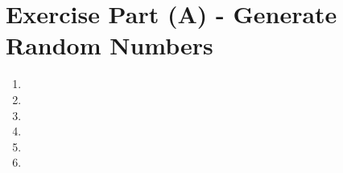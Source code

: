 \section*{Exercise Part (A) - Generate Random Numbers}

\begin{enumerate}[wide, label=(A\arabic*)]

\item

\item

\item

\item

\item

\item

\end{enumerate}


